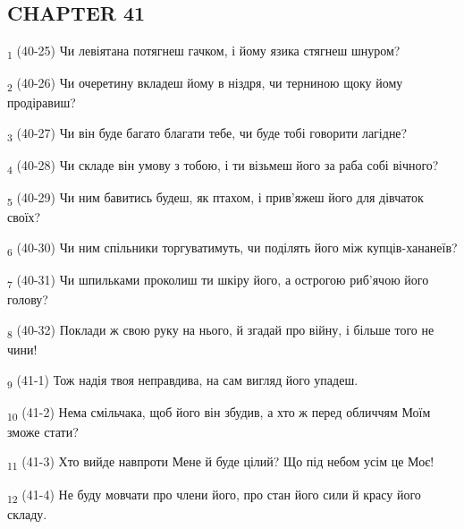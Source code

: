 \subsection{CHAPTER 41}
\begin{tcolorbox}
\textsubscript{1} (40-25) Чи левіятана потягнеш гачком, і йому язика стягнеш шнуром?
\end{tcolorbox}
\begin{tcolorbox}
\textsubscript{2} (40-26) Чи очеретину вкладеш йому в ніздря, чи терниною щоку йому продіравиш?
\end{tcolorbox}
\begin{tcolorbox}
\textsubscript{3} (40-27) Чи він буде багато благати тебе, чи буде тобі говорити лагідне?
\end{tcolorbox}
\begin{tcolorbox}
\textsubscript{4} (40-28) Чи складе він умову з тобою, і ти візьмеш його за раба собі вічного?
\end{tcolorbox}
\begin{tcolorbox}
\textsubscript{5} (40-29) Чи ним бавитись будеш, як птахом, і прив'яжеш його для дівчаток своїх?
\end{tcolorbox}
\begin{tcolorbox}
\textsubscript{6} (40-30) Чи ним спільники торгуватимуть, чи поділять його між купців-хананеїв?
\end{tcolorbox}
\begin{tcolorbox}
\textsubscript{7} (40-31) Чи шпильками проколиш ти шкіру його, а острогою риб'ячою його голову?
\end{tcolorbox}
\begin{tcolorbox}
\textsubscript{8} (40-32) Поклади ж свою руку на нього, й згадай про війну, і більше того не чини!
\end{tcolorbox}
\begin{tcolorbox}
\textsubscript{9} (41-1) Тож надія твоя неправдива, на сам вигляд його упадеш.
\end{tcolorbox}
\begin{tcolorbox}
\textsubscript{10} (41-2) Нема смільчака, щоб його він збудив, а хто ж перед обличчям Моїм зможе стати?
\end{tcolorbox}
\begin{tcolorbox}
\textsubscript{11} (41-3) Хто вийде навпроти Мене й буде цілий? Що під небом усім це Моє!
\end{tcolorbox}
\begin{tcolorbox}
\textsubscript{12} (41-4) Не буду мовчати про члени його, про стан його сили й красу його складу.
\end{tcolorbox}
